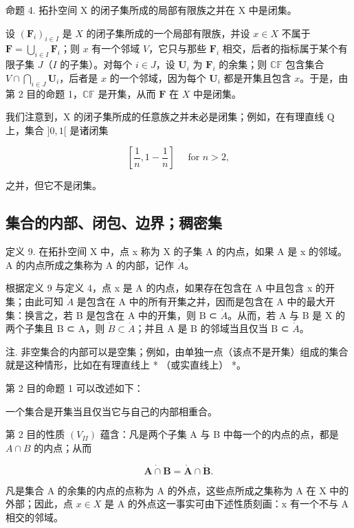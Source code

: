 命题 4. 拓扑空间 X 的闭子集所成的局部有限族之并在 X 中是闭集。

设 \((\mathbf{F}_i)_{i\in I}\) 是 \(X\) 的闭子集所成的一个局部有限族，并设 \(x\in X\) 不属于 \(\mathbf{F} = \bigcup_{i\in I}\mathbf{F}_i\)；则 \(x\) 有一个邻域 \(V\)，它只与那些 \(\mathbf{F}_i\) 相交，后者的指标属于某个有限子集 \(J\)（\(I\) 的子集）。对每个 \(i\in J\)，设 \(\mathbf{U}_i\) 为 \(\mathbf{F}_i\) 的余集；则 \(\mathbb{CF}\) 包含集合 \(V\cap \bigcap_{i\in J}\mathbf{U}_i\)，后者是 \(x\) 的一个邻域，因为每个 \(\mathbf{U}_i\) 都是开集且包含 \(x\)。于是，由第 2 目的命题 1，\(\mathbb{CF}\) 是开集，从而 \(\mathbf{F}\) 在 \(X\) 中是闭集。

我们注意到，X 的闭子集所成的任意族之并未必是闭集；例如，在有理直线 Q 上，集合 \(]0, 1[\) 是诸闭集

\[
\left[ \frac {1}{n}, 1 - \frac {1}{n} \right] \quad \text { for } n > 2,
\]

之并，但它不是闭集。

\subsection{集合的内部、闭包、边界；稠密集}

定义 9. 在拓扑空间 X 中，点 x 称为 X 的子集 A 的内点，如果 A 是 x 的邻域。A 的内点所成之集称为 A 的内部，记作 \(\mathring{A}\)。

根据定义 9 与定义 4，点 x 是 A 的内点，如果存在包含在 A 中且包含 x 的开集；由此可知 \(\mathring{A}\) 是包含在 A 中的所有开集之并，因而是包含在 A 中的最大开集：换言之，若 B 是包含在 A 中的开集，则 B ⊂ \(\mathring{A}\)。从而，若 A 与 B 是 X 的两个子集且 B ⊂ A，则 \(\mathring{B} \subset \mathring{A}\)；并且 A 是 B 的邻域当且仅当 B ⊂ \(\mathring{A}\)。

注. 非空集合的内部可以是空集；例如，由单独一点（该点不是开集）组成的集合就是这种情形，比如在有理直线上 * （或实直线上） *。

第 2 目的命题 1 可以改述如下：

一个集合是开集当且仅当它与自己的内部相重合。

第 2 目的性质 \((V_{II})\) 蕴含：凡是两个子集 A 与 B 中每一个的内点的点，都是 \(A \cap B\) 的内点；从而

\[
\mathring {\mathbf {A} \cap \mathbf {B}} = \mathring {\mathbf {A}} \cap \mathring {\mathbf {B}}.\tag{1}
\]

凡是集合 A 的余集的内点的点称为 A 的外点，这些点所成之集称为 A 在 X 中的外部；因此，点 \(x \in X\) 是 A 的外点这一事实可由下述性质刻画：x 有一个不与 A 相交的邻域。

